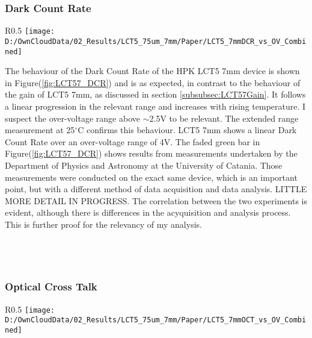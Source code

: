 \documentclass[article,type=msc,colorback,accentcolor=tud9c]{tudthesis}
\begin{document}
\newpage
\subsubsection{Dark Count Rate}
\label{subsubsec:LCT57DCR}
\begin{wrapfigure}{R}{0.5\textwidth}
\centering
\texttt{[image: D:/OwnCloudData/02\_Results/LCT5\_75um\_7mm/Paper/LCT5\_7mmDCR\_vs\_OV\_Combined]}
\caption{\label{fig:LCT57_DCR}Dark Count Rate of the HPK LCT5 7mm pixel}
\end{wrapfigure}


The behaviour of the Dark Count Rate of the HPK LCT5 7mm device is shown in Figure(\ref{fig:LCT57_DCR}) and is as expected, in contrast to the behaviour of the gain of LCT5 7mm, as discussed in section \ref{subsubsec:LCT57Gain}. It follows a linear progression in the relevant range and increases with rising temperature. I suspect the over-voltage range above $\sim$2.5V to be relevant. The extended range measurement at 25$^\circ$C confirms this behaviour. LCT5 7mm shows a linear Dark Count Rate over an over-voltage range of 4V. The faded green bar in Figure(\ref{fig:LCT57_DCR}) shows results from measurements undertaken by the Department of Physics and Astronomy at the University of Catania. Those measurements were conducted on the exact same device, which is an important point, but with a different method of data acquisition and data analysis. LITTLE MORE DETAIL IN PROGRESS. The correlation between the two experiments is evident, although there is differences in the acyquisition and analysis process. This is further proof for the relevancy of my analysis. 
\\\\\\\\

\newpage
\subsubsection{Optical Cross Talk}
\begin{wrapfigure}{R}{0.5\textwidth}
\centering
\texttt{[image: D:/OwnCloudData/02\_Results/LCT5\_75um\_7mm/Paper/LCT5\_7mmOCT\_vs\_OV\_Combined]}
\caption{\label{fig:LCT57_OCT}Dark Count Rate of the HPK LCT5 7mm pixel}
\end{wrapfigure}
\end{document}
